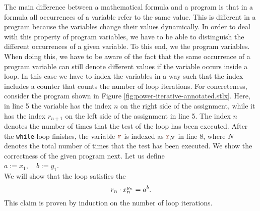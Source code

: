 The main difference between a mathematical formula and a program is that in a formula all
occurrences of a variable refer to the same value.   This is different in a program because the
variables change their values dynamically.  In order to deal with this property of program variables,
we have to be able to distinguish the different occurrences of a given variable.  To this end,  we 
 the program variables. 
When doing this, we have to be aware of the fact that the same occurrence of a program variable can
still denote different values if the variable occurs inside  a loop.  In this case we have to index
the variables in a way such that the index includes a counter that counts the number of loop iterations.
For concreteness, consider the  program shown in 
Figure \ref{fig:power-iterative-annotated.stlx}.  
Here, in line 5 the variable  has the index $n$ on the right side of the assignment,
while it has the index $r_{n+1}$ on the left side of the assignment in line 5.  The index $n$ denotes 
the number of times that the test  of the  loop has been executed.
After the \texttt{while}-loop finishes, the variable $\mytt{r}$ is indexed as
$\mytt{r}_N$ in line 8, where $N$ denotes the total number of times that the test  has been executed.
We show the correctness of the given program next.  Let us define
\\[0.2cm]
\hspace*{1.3cm}
$ a := x_1, \quad b := y_1$.
\\[0.2cm]
We will show that the  loop satisfies the 
\begin{equation}
  \label{eq:powerInv}
  \displaystyle r_n \cdot x_n^{y_n} = a^b.
\end{equation}
This claim is proven by induction on the number of loop iterations.

